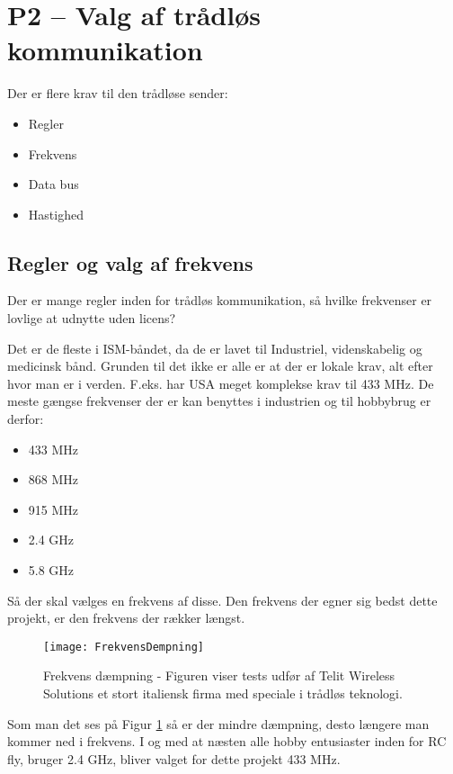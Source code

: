 \documentclass[Main]{subfiles}
\begin{document}
\section[Valg af trådløs kommunikation]{P2 -- Valg af trådløs kommunikation}

Der er flere krav til den trådløse sender:
\begin{itemize}
\item Regler
\item Frekvens
\item Data bus
\item Hastighed
\end{itemize}

\subsection{Regler og valg af frekvens}
Der er mange regler inden for trådløs kommunikation, så hvilke frekvenser er lovlige at udnytte uden licens?

Det er de fleste i ISM-båndet, da de er lavet til  Industriel, videnskabelig og medicinsk bånd. 
Grunden til det ikke er alle er at der er lokale krav, alt efter hvor man er i verden. 
F.eks. har USA meget komplekse krav til 433 MHz\cite[s. 32]{Lov1}.
De meste gængse frekvenser der er kan benyttes i industrien og til hobbybrug er derfor:

\begin{itemize}
\item 433 MHz
\item 868 MHz
\item 915 MHz
\item 2.4 GHz
\item 5.8 GHz
\end{itemize}

Så der skal vælges en frekvens af disse.
Den frekvens der egner sig bedst dette projekt, er den frekvens der rækker længst. 

\begin{figure}[H]
\centering
\texttt{[image: FrekvensDempning]}
\caption{Frekvens dæmpning - Figuren viser tests udfør af Telit Wireless Solutions\cite[s. 43]{Telit} et stort italiensk firma med speciale i trådløs teknologi.}
\label{Fig:dempning}
\end{figure}


Som man det ses på Figur \ref{Fig:dempning} så er der mindre dæmpning, desto længere man kommer ned i frekvens.
I og med at næsten alle hobby entusiaster inden for RC fly, bruger 2.4 GHz, bliver valget for dette projekt 433 MHz.
\end{document}
